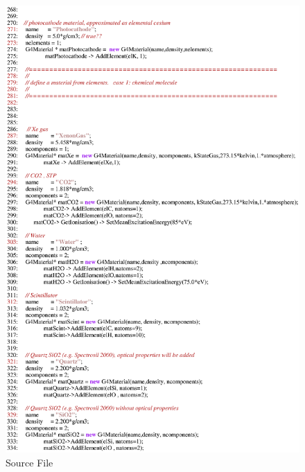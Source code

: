 \begin{figure}[h]
  \hspace{0cm}
  \includegraphics[scale=0.8]{./figures17/QweakSimMaterial.cc-p5.eps}
  \caption{\label{SourceXVII6} Source File}
           \label{fig:XVII-SC-6}
\end{figure}
\clearpage

